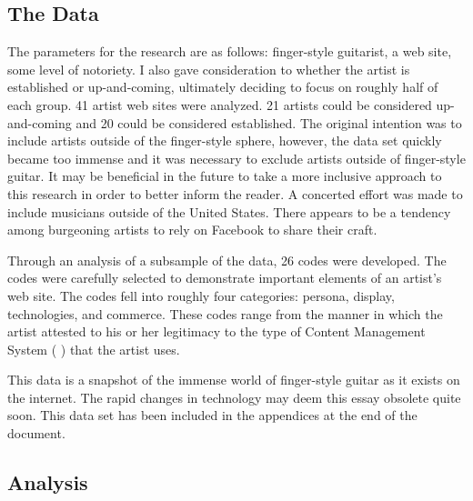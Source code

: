 \documentclass[unicode,hyperfootnotes=false,xetex,colorlinks=true,nofonts,nobib]{tufte-handout}
\newcommand{\textls}[2][5]{%
    \begingroup\addfontfeatures{LetterSpace=#1}#2\endgroup
  }
\renewcommand{\smallcapsspacing}[1]{\textls[10]{#1}}
\renewcommand{\textsc}[1]{\smallcapsspacing{\textsmallcaps{#1}}}
\begin{document}
\subsection{The Data}
\label{sec:data}
The parameters for the research are as follows: finger-style
guitarist, a web site, some level of notoriety. I also gave
consideration to whether the artist is established or up-and-coming,
ultimately deciding to focus on roughly half of each group. 41 artist
web sites were analyzed. 21 artists could be considered up-and-coming
and 20 could be considered established. The original intention was to
include artists outside of the finger-style sphere, however, the data
set quickly became too immense and it was necessary to exclude artists
outside of finger-style guitar. It may be beneficial in the future to
take a more inclusive approach to this research in order to better
inform the reader. A concerted effort was made to include musicians
outside of the United States. There appears to be a tendency among
burgeoning artists to rely on Facebook to share their craft.

Through an analysis of a subsample of the data, 26 codes were
developed. The codes were carefully selected to demonstrate important
elements of an artist's web site. The codes fell into roughly four
categories: persona, display, technologies, and commerce. These codes
range from the manner in which the artist attested to his or her
legitimacy to the type of Content Management System (\textsc{cms})
that the artist uses.

This data is a snapshot of the immense world of finger-style guitar as
it exists on the internet. The rapid changes in technology may deem
this essay obsolete quite soon. This data set has been included in the
appendices at the end of the document.

\subsection{Analysis}
\label{sec:analysis}
\end{document}
